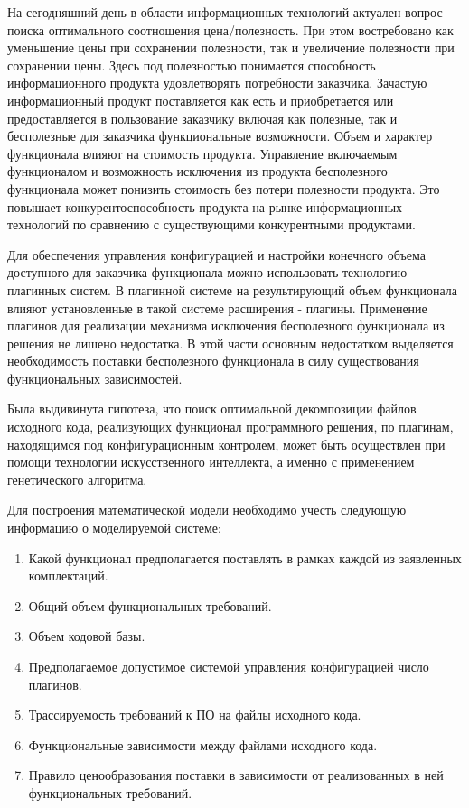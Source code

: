 На сегодняшний день в области информационных технологий актуален вопрос поиска оптимального соотношения цена/полезность. При этом востребовано как уменьшение цены при сохранении полезности, так и увеличение полезности при сохранении цены. Здесь под полезностью понимается способность информационного продукта удовлетворять потребности заказчика. Зачастую информационный продукт поставляется как есть и приобретается или предоставляется в пользование заказчику включая как полезные, так и бесполезные для заказчика функциональные возможности. Объем и характер функционала влияют на стоимость продукта. Управление включаемым функционалом и возможность исключения из продукта бесполезного функционала может понизить стоимость без потери полезности продукта. Это повышает конкурентоспособность продукта на рынке информационных технологий по сравнению с существующими конкурентными продуктами.

Для обеспечения управления конфигурацией и настройки конечного объема доступного для заказчика функционала можно использовать технологию плагинных систем. В плагинной системе на результирующий объем функционала влияют установленные в такой системе расширения - плагины. Применение плагинов для реализации механизма исключения бесполезного функционала из решения не лишено недостатка. В этой части основным недостатком выделяется необходимость поставки бесполезного функционала в силу существования функциональных зависимостей.

Была выдивинута гипотеза, что поиск оптимальной декомпозиции файлов исходного кода, реализующих функционал программного решения, по плагинам, находящимся под конфигурационным контролем, может быть осуществлен при помощи технологии искусственного интеллекта, а именно с применением генетического алгоритма.

Для построения математической модели необходимо учесть следующую информацию о моделируемой системе:
\begin{enumerate}
    \item Какой функционал предполагается поставлять в рамках каждой из заявленных комплектаций.
    \item Общий объем функциональных требований.
    \item Объем кодовой базы.
    \item Предполагаемое допустимое системой управления конфигурацией число плагинов.
    \item Трассируемость требований к ПО на файлы исходного кода.
    \item Функциональные зависимости между файлами исходного кода.
    \item Правило ценообразования поставки в зависимости от реализованных в ней функциональных требований.
\end{enumerate}

